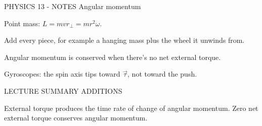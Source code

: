 PHYSICS 13 - NOTES
Angular momentum

Point mass: \(L = mvr_\perp = mr^2\omega\).

Add every piece, for example a hanging mass plus the wheel it unwinds from.

Angular momentum is conserved when there's no net external torque.

Gyroscopes: the spin axis tips toward \(\vec\tau\), not toward the push.

LECTURE SUMMARY ADDITIONS

External torque produces the time rate of change of angular momentum. Zero net external torque conserves angular momentum.
